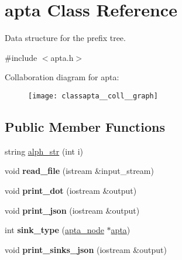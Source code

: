 \hypertarget{classapta}{}\section{apta Class Reference}
\label{classapta}


Data structure for the prefix tree.  




{\ttfamily \#include $<$apta.\+h$>$}



Collaboration diagram for apta\+:
\nopagebreak
\begin{figure}[H]
\begin{center}
\leavevmode
\texttt{[image: classapta\_\_coll\_\_graph]}
\end{center}
\end{figure}
\subsection*{Public Member Functions}
\begin{DoxyCompactItemize}
\item 
string \hyperlink{classapta_a244ffcaf3ff27062eec5463d26033ac8}{alph\+\_\+str} (int i)
\item 
\mbox{\label{classapta_aba445f4073c6358d699f523f6f8890b3}} 
void {\bfseries read\+\_\+file} (istream \&input\+\_\+stream)
\item 
\mbox{\label{classapta_ac882456f8a38ed04e27763f25580975f}} 
void {\bfseries print\+\_\+dot} (iostream \&output)
\item 
\mbox{\label{classapta_a495bfaf4c9c994f979836adc083a3bf6}} 
void {\bfseries print\+\_\+json} (iostream \&output)
\item 
\mbox{\label{classapta_a81486fd0903cbc20ada8a3e326266de5}} 
int {\bfseries sink\+\_\+type} (\hyperlink{classapta__node}{apta\+\_\+node} $\ast$\hyperlink{classapta}{apta})
\item 
\mbox{\label{classapta_a12f319e06b8aabf29949395a1bb06551}} 
void {\bfseries print\+\_\+sinks\+\_\+json} (iostream \&output)
\end{DoxyCompactItemize}
